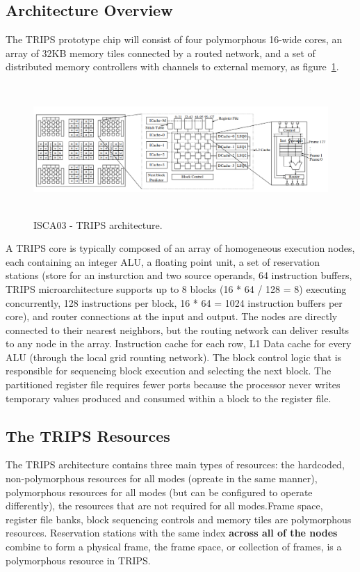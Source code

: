 \documentclass[UTF8,12pt,a4paper]{article}
\begin{document}
\subsection{Architecture Overview}
The TRIPS prototype chip will consist of four polymorphous 16-wide cores,
an array of 32KB memory tiles connected by a routed network,
and a set of distributed memory controllers with channels to external memory,
as figure~\ref{fig:trips_arch}.

\begin{figure}[htb]
  \begin{small}
    \begin{center}
      \includegraphics[width=\textwidth,height=5cm]{figures/isca03_trips_arch.png}
    \end{center}
    \caption{ISCA03 - TRIPS architecture.}
    \label{fig:trips_arch}
  \end{small}
\end{figure}

A TRIPS core is typically composed of an array of homogeneous execution nodes,
each containing an integer ALU, a floating point unit, a set of reservation stations
(store for an insturction and two source operands, 64 instruction buffers,
TRIPS microarchitecture supports up to 8 blocks (16 * 64 / 128 = 8) executing concurrently,
128 instructions per block, 16 * 64 = 1024 instruction buffers per core),
and router connections at the input and output.
The nodes are directly connected to their nearest neighbors,
but the routing network can deliver results to any node in the array.
Instruction cache for each row, L1 Data cache for every ALU (through the local grid rounting network).
The block control logic that is responsible for sequencing block execution and selecting the next block.
The partitioned register file requires fewer ports because the processor never
writes temporary values produced and consumed within a block to the register file.

\subsection{The TRIPS Resources}
The TRIPS architecture contains three main types of resources: 
the hardcoded, non-polymorphous resources for all modes (opreate in the same manner),
polymorphous resources for all modes (but can be configured to operate differently),
the resources that are not required for all modes.Frame space, register file banks,
block sequencing controls and memory tiles are polymorphous resources.
Reservation stations with the same index \textbf{across all of the nodes} combine to form a physical frame,
the frame space, or collection of frames, is a polymorphous resource in TRIPS.
\end{document}
